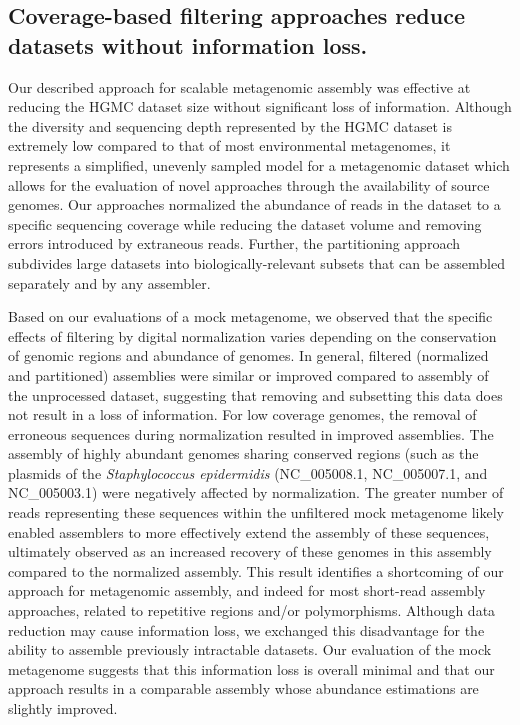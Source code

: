 \documentclass{pnastwo}
\begin{document}
\begin{article}
\subsection*{Coverage-based filtering approaches reduce datasets without information loss.} 
Our described approach for scalable metagenomic assembly was effective at reducing the HGMC
dataset size without significant loss of information.  Although the
diversity and sequencing depth represented by the HGMC dataset is extremely low
compared to that of most environmental metagenomes, it represents a simplified,
unevenly sampled model for a metagenomic dataset which allows for the evaluation
of novel approaches through the availability of source genomes. Our approaches
normalized the abundance of reads in the dataset to a specific sequencing coverage
while reducing the dataset volume and removing errors introduced by extraneous reads. Further, the partitioning approach subdivides large datasets into biologically-relevant subsets that can be assembled separately and by any assembler. 

Based on our evaluations of a mock metagenome, we observed that the specific effects of filtering by digital normalization varies depending on the conservation of genomic regions and abundance of genomes.  In general, filtered (normalized and partitioned) assemblies were similar or improved compared to assembly of the unprocessed dataset, suggesting that removing and subsetting this data does not result in a loss of information.  For low coverage genomes, the removal of erroneous sequences during normalization resulted in improved assemblies.  The assembly of highly abundant genomes sharing conserved regions (such as the plasmids of the \emph{Staphylococcus epidermidis} (NC\_005008.1,
NC\_005007.1, and NC\_005003.1) were negatively affected by normalization.  The greater number of reads representing these sequences within the unfiltered mock metagenome likely
enabled assemblers to more effectively extend the assembly of these
sequences, ultimately observed as an increased recovery of these genomes in
this assembly compared to the normalized assembly.  This result identifies a
shortcoming of our approach for metagenomic assembly, and indeed for most short-read assembly approaches,
related to repetitive regions and/or polymorphisms. Although data reduction may
cause information loss, we exchanged this disadvantage for the ability to
assemble previously intractable datasets. Our evaluation of the mock metagenome
suggests that this information loss is overall minimal and that our approach
results in a comparable assembly whose abundance estimations are slightly
improved.


\end{article}
\end{document}
